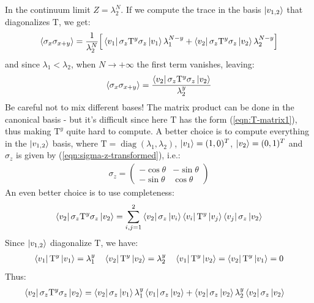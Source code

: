 \documentclass[12pt,a4paper]{report}
\begin{document}
\begin{enumerate}
        In the continuum limit $Z = \lambda_2^N$. If we compute the trace in the basis $\ket{v_{1,2}}$ that diagonalizes $\mathrm{T}$, we get:
        \begin{align*}
            \langle \sigma_x \sigma_{x+y} \rangle = \frac{1}{\lambda_2^N} \Big[ \bra{v_1} \sigma_z \mathrm{T}^y \sigma_z \ket{v_1} \lambda_1^{N-y} + \bra{v_2} \sigma_z \mathrm{T}^y \sigma_z \ket{v_2} \lambda_2^{N-y} \Big]
        \end{align*}
        and since $\lambda_1 < \lambda_2$, when $N \to +\infty$ the first term vanishes, leaving:
        \begin{align*}
            \langle \sigma_x \sigma_{x+y} \rangle = \frac{\bra{v_2} \sigma_z \mathrm{T}^y \sigma_z \ket{v_2}}{\lambda_2^y} 
        \end{align*}
        Be careful not to mix different bases! The matrix product can be done in the canonical basis - but it's difficult since here $\mathrm{T}$ has the form (\ref{eqn:T-matrix1}), thus making $\mathrm{T}^y$ quite hard to compute. A better choice is to compute everything in the $\ket{v_{1,2}}$ basis, where $\mathrm{T} = \operatorname{diag}(\lambda_1, \lambda_2)$, $\ket{v_{1}} = (1,0)^T$, $\ket{v_2} = (0,1)^T$ and $\sigma_z$ is given by (\ref{eqn:sigma-z-transformed}), i.e.:
        \begin{align*}
            \sigma_z = \left(\begin{array}{cc}
            -\cos \theta & -\sin \theta \\ 
            - \sin \theta & \cos \theta
            \end{array}\right)
        \end{align*}
        An even better choice is to use completeness:
        \begin{align*}
            \bra{v_2} \sigma_z \mathrm{T}^y \sigma_z \ket{v_2} = \sum_{i,j=1}^2 \bra{v_2}\sigma_z \ket{v_i} \bra{v_i} \mathrm{T}^y \ket{v_j}\bra{v_j} \sigma_z \ket{v_2}
        \end{align*}
        Since $\ket{v_{1,2}}$ diagonalize $\mathrm{T}$, we have:
        \begin{align*}
            \bra{v_1} \mathrm{T}^y \ket{v_1} = \lambda_1^y \quad \bra{v_2} \mathrm{T}^y \ket{v_2} = \lambda_2^y \quad \bra{v_1} \mathrm{T}^y \ket{v_2} = \bra{v_2} \mathrm{T}^y \ket{v_1} = 0
        \end{align*}
        Thus:
        \begin{align*}
            \bra{v_2} \sigma_z \mathrm{T}^y \sigma_z \ket{v_2} &= \bra{v_2} \sigma_z \ket{v_1} \lambda_1^y \bra{v_1} \sigma_z \ket{v_2} + \bra{v_2} \sigma_z \ket{v_2} \lambda_2^y \bra{v_2} \sigma_z \ket{v_2}

\end{align*}
\end{enumerate}
\end{document}
